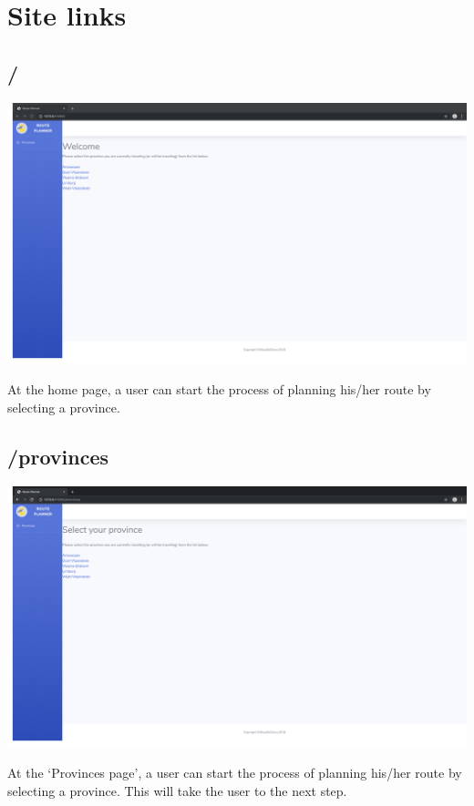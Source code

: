 \documentclass[12pt]{article}
\begin{document}
\newpage

\section{Site links}

\subsection{/}
\begin{center}
	\includegraphics[width=\linewidth]{images/Homepage.png}
\end{center}
At the home page, a user can start the process of planning his/her route by selecting a province.

\subsection{/provinces}
\begin{center}
	\includegraphics[width=\linewidth]{images/Select_province.png}
\end{center}
At the \lq Provinces page\rq, a user can start the process of planning his/her route by selecting a province. This will take the user to the next step.
\end{document}
